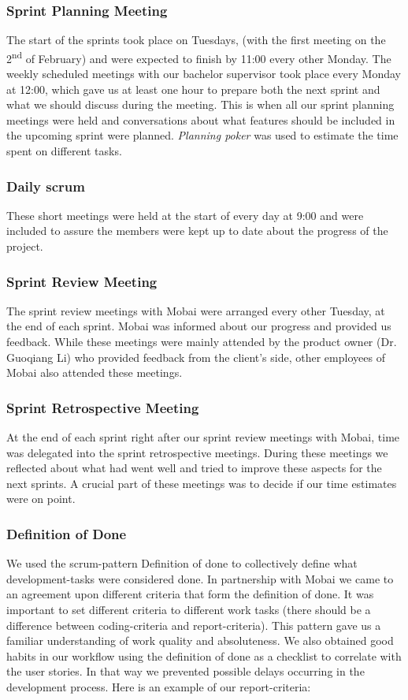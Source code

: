 \subsubsection*{Sprint Planning Meeting}
The start of the sprints took place on Tuesdays, (with the first meeting on the 2\textsuperscript{nd} of February) and were expected to finish by 11:00 every other Monday. The weekly scheduled meetings with our bachelor supervisor took place every Monday at 12:00, which gave us at least one hour to prepare both the next sprint and what we should discuss during the meeting. This is when all our sprint planning meetings were held and conversations about what features should be included in the upcoming sprint were planned. \textit{Planning poker} was used to estimate the time spent on different tasks.

\subsubsection*{Daily scrum}
These short meetings were held at the start of every day at 9:00 and were included to assure the members were kept up to date about the progress of the project.

\subsubsection*{Sprint Review Meeting}
The sprint review meetings with Mobai were arranged every other Tuesday, at the end of each sprint. Mobai was informed about our progress and provided us feedback. While these meetings were mainly attended by the product owner (Dr. Guoqiang Li) who provided feedback from the client's side, other employees of Mobai also attended these meetings. 

\subsubsection*{Sprint Retrospective Meeting}
At the end of each sprint right after our sprint review meetings with Mobai, time was delegated into the sprint retrospective meetings. During these meetings we reflected about what had went well and tried to improve these aspects for the next sprints. A crucial part of these meetings was to decide if our time estimates were on point. 

\subsubsection{Definition of Done}
\label{sec:DefinitionofDone}
We used the scrum-pattern Definition of done \cite{DoneDone} to collectively define what development-tasks were considered done. In partnership with Mobai we came to an agreement upon different criteria that form the definition of done. It was important to set different criteria to different work tasks (there should be a difference between coding-criteria and report-criteria). This pattern gave us a familiar understanding of work quality and absoluteness. We also obtained good habits in our workflow using the definition of done as a checklist to correlate with the user stories. In that way we prevented possible delays occurring in the development process. Here is an example of our report-criteria: 

